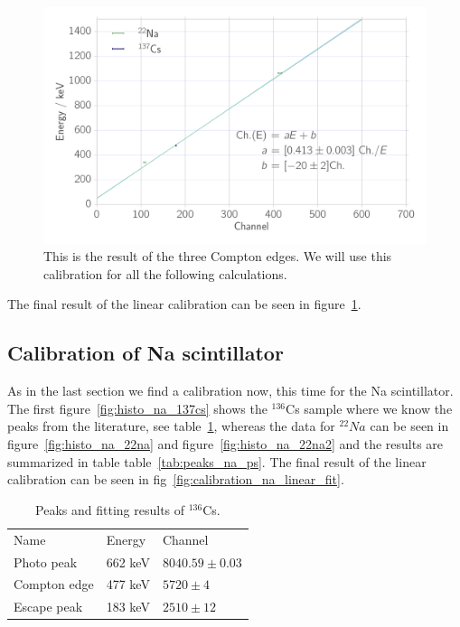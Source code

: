 \begin{figure}[htpb]
    \centering
    \includegraphics[width=0.9\linewidth]{./analysis/figures/calibration_ps_linear_fit}
    \caption{This is the result of the three Compton edges. We will use this calibration
    for all the following calculations.}
\label{fig:calibration_ps_linear_fit}
\end{figure}
The final result of the linear calibration can be seen in
figure~\ref{fig:calibration_ps_linear_fit}.

\subsection{Calibration of Na scintillator}

\label{sub:calibration_of_na_scintillator}
As in the last section we find a calibration now, this time for the Na scintillator. The
first figure~\ref{fig:histo_na_137cs} shows the $^{136}$Cs sample where we know the
peaks from the literature, see table~\ref{tab:peaks_cs_ps}, whereas the data for
$^{22}Na$ can be seen in figure~\ref{fig:histo_na_22na} and figure~\ref{fig:histo_na_22na2}
and the results are summarized in table table~\ref{tab:peaks_na_ps}. 
The final result of the linear calibration can be seen in
fig~\ref{fig:calibration_na_linear_fit}.
\begin{table}[htpb]
    \centering
    \caption{Peaks and fitting results of $^{136}$Cs.}
\label{tab:peaks_cs_ps}
    \begin{tabular}{lll}
        \rowcolor{LightCyan} Name &Energy & Channel \\ 
        Photo peak & 662 keV & $8040.59 \pm 0.03$\\ 
        Compton edge & 477 keV & $5720 \pm 4$\\  
        Escape peak & 183 keV & $2510 \pm 12$
    \end{tabular}
\end{table}


